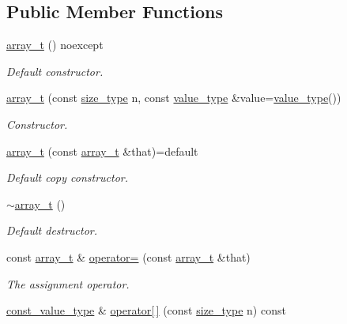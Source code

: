 \subsection*{Public Member Functions}
\begin{DoxyCompactItemize}
\item 
\hyperlink{classatom_1_1array__t_ac909dffe60e64d871a3c23e74480cdf1}{array\+\_\+t} () noexcept
\begin{DoxyCompactList}\small\item\em Default constructor. \end{DoxyCompactList}\item 
\hyperlink{classatom_1_1array__t_a9f3f72a3c77e55f6f18bfcfb065b78b3}{array\+\_\+t} (const \hyperlink{classatom_1_1array__t_a8534f23c7f0082698cbd708e1f2e26ff}{size\+\_\+type} n, const \hyperlink{classatom_1_1array__t_aeb485cd6190dc11ddb8e7f48c09451c4}{value\+\_\+type} \&value=\hyperlink{classatom_1_1array__t_aeb485cd6190dc11ddb8e7f48c09451c4}{value\+\_\+type}())
\begin{DoxyCompactList}\small\item\em Constructor. \end{DoxyCompactList}\item 
\mbox{\label{classatom_1_1array__t_a90c35f817089cdefbfc68a493dac97cf}} 
\hyperlink{classatom_1_1array__t_a90c35f817089cdefbfc68a493dac97cf}{array\+\_\+t} (const \hyperlink{classatom_1_1array__t}{array\+\_\+t} \&that)=default
\begin{DoxyCompactList}\small\item\em Default copy constructor. \end{DoxyCompactList}\item 
\hyperlink{classatom_1_1array__t_afc5abfb4d2764ef27b0fb237e4dd63a3}{$\sim$array\+\_\+t} ()
\begin{DoxyCompactList}\small\item\em Default destructor. \end{DoxyCompactList}\item 
const \hyperlink{classatom_1_1array__t}{array\+\_\+t} \& \hyperlink{classatom_1_1array__t_aee988e07623e2c643765a286eb52eea6}{operator=} (const \hyperlink{classatom_1_1array__t}{array\+\_\+t} \&that)
\begin{DoxyCompactList}\small\item\em The assignment operator. \end{DoxyCompactList}\item 
\hyperlink{classatom_1_1array__t_a9c33ee3fb4e5b4d57c7801a8f69ada14}{const\+\_\+value\+\_\+type} \& \hyperlink{classatom_1_1array__t_aa6995427dae0b4a3ce63d8fd47ed3121}{operator\mbox{[}$\,$\mbox{]}} (const \hyperlink{classatom_1_1array__t_a8534f23c7f0082698cbd708e1f2e26ff}{size\+\_\+type} n) const

\end{DoxyCompactItemize}
